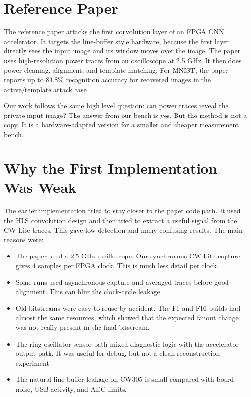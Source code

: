 \documentclass[10pt,conference]{IEEEtran}
\begin{document}
\section{Reference Paper}

The reference paper attacks the first convolution layer of an FPGA CNN
accelerator. It targets the line-buffer style hardware, because the first layer
directly sees the input image and its window moves over the image. The paper
uses high-resolution power traces from an oscilloscope at 2.5 GHz. It then does
power cleaning, alignment, and template matching. For MNIST, the paper reports
up to 89.8\% recognition accuracy for recovered images in the active/template
attack case \cite{wei2018iknow}.

Our work follows the same high level question: can power traces reveal the
private input image? The answer from our bench is yes. But the method is not a
copy. It is a hardware-adapted version for a smaller and cheaper measurement
bench.

\section{Why the First Implementation Was Weak}

The earlier implementation tried to stay closer to the paper code path. It used
the HLS convolution design and then tried to extract a useful signal from the
CW-Lite traces. This gave low detection and many confusing results. The main
reasons were:

\begin{itemize}
  \item The paper used a 2.5 GHz oscilloscope. Our synchronous CW-Lite capture
  gives 4 samples per FPGA clock. This is much less detail per clock.
  \item Some runs used asynchronous capture and averaged traces before good
  alignment. This can blur the clock-cycle leakage.
  \item Old bitstreams were easy to reuse by accident. The F1 and F16 builds had
  almost the same resources, which showed that the expected fanout change was
  not really present in the final bitstream.
  \item The ring-oscillator sensor path mixed diagnostic logic with the
  accelerator output path. It was useful for debug, but not a clean
  reconstruction experiment.
  \item The natural line-buffer leakage on CW305 is small compared with board
  noise, USB activity, and ADC limits.
\end{itemize}
\end{document}
